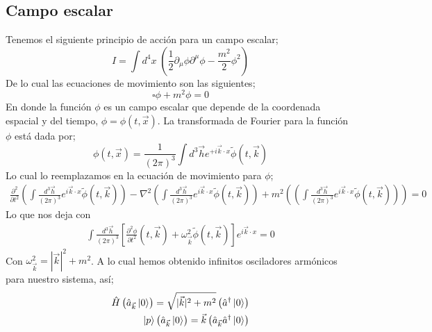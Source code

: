 \documentclass[../main.tex]{subfiles}
\begin{document}
\subsection{Campo escalar}
Tenemos el siguiente principio de acción para un campo escalar;
\begin{equation}
  I = \int d^4x \; \left( \frac{1}{2}\partial_\mu \phi \partial^\mu \phi - \frac{m^2}{2}\phi^2 \right)
 \end{equation}
 De lo cual las ecuaciones de movimiento son las siguientes;
 \begin{equation}
   \square \phi + m^2\phi = 0
  \end{equation}
  En donde la función $\phi$ es un campo escalar que depende de la coordenada espacial y del tiempo, $\phi=\phi(t,\vec{x})$. La transformada de Fourier para la función $\phi$ está dada por;
  \begin{equation}
    \phi(t,\vec{x}) = \frac{1}{\left( 2\pi \right)^3} \int d^3\vec{h} e^{+i\vec{k}\cdot{x}} \tilde{\phi}(t,\vec{k})
   \end{equation}
   Lo cual lo reemplazamos en la ecuación de movimiento para $\phi$;
   \begin{align*}
     \frac{\partial^2}{\partial t^2} \left( \int \frac{d^3\vec{h}}{(2\pi)^3} e^{i\vec{k}\cdot{x}} \tilde{\phi}(t,\vec{k}) \right) - \nabla^2  \left( \int \frac{d^3\vec{h}}{(2\pi)^3} e^{i\vec{k}\cdot{x}} \tilde{\phi}(t,\vec{k}) \right) + m^2 \left( \left( \int \frac{d^3\vec{h}}{(2\pi)^3} e^{i\vec{k}\cdot{x}} \tilde{\phi}(t,\vec{k}) \right) \right) = 0
   \end{align*}
   Lo que nos deja con
   \begin{align*}
     \int \frac{d^3\vec{h}}{(2\pi)^3} \left[ \frac{\partial^2\phi}{\partial t^2}(t,\vec{k}) + \omega^2_{\vec{k}} \tilde{\phi}(t,\vec{k}) \right] e^{i\vec{k}\cdot{x}} = 0
   \end{align*} 
   Con $\omega_{\vec{k}}^2= |\vec{k}|^2 + m^2$. A lo cual hemos obtenido infinitos osciladores armónicos para nuestro sistema, así;
   \begin{align*}
     \hat{H} \left( \hat{a}_{\vec{k}}\ket{0} \right) = \sqrt{|\vec{k}|^2 + m^2} \left( \hat{a}^\dagger \ket{0} \right) \\
     \ket{p} \left( \hat{a}_{\vec{k}}\ket{0} \right) = \vec{k} \left( \hat{a}_{\vec{k}}\hat{a}^\dagger \ket{0} \right)
   \end{align*}
   
\end{document}
